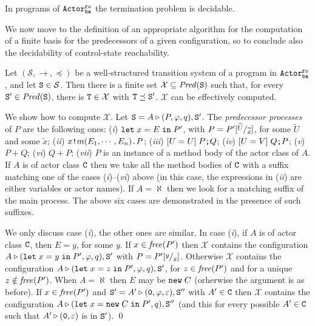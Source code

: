 \documentclass{LMCS}
\newcommand{\cal}{\mathcal}
\theoremstyle{plain}\newtheorem{proposition}[thm]{Proposition}
\theoremstyle{plain}\newtheorem{lemma}[thm]{Lemma}
\theoremstyle{plain}\newtheorem{theorem}[thm]{Theorem}
\theoremstyle{plain}\newtheorem{corollary}[thm]{Corollary}
\newif\ifconf \conffalse
\newif\ifcamera \camerafalse
\newcommand{\subst}[2]{[\raisebox{.5ex}{\footnotesize$#1$}  /
                        \raisebox{-.5ex}{\footnotesize$#2$} ]}
\newcommand{\pinull}{{\tt 0}}
\newcommand{\invk}{\mbox{\tt !}}
\newcommand{\prefix}{\mbox{\tt .}}
\newcommand{\newact}[1]{{\tt new} \; #1}
\newcommand{\letin}[3]{{\tt let} \; #1 = #2 \; {\tt in} \; #3}
\newcommand{\State}{{\tt S}}
\newcommand{\StateT}{{\tt T}}
\newcommand{\lred}[1]{\stackrel{#1}{\longrightarrow}}
\newcommand{\ite}{\mbox{{\tt ;}}}
\newcommand{\free}[1]{{\it free}(#1)}
\newcommand{\pred}[1]{{\it Pred}(#1)}
\newcommand{\wt}[1]{\widetilde{#1}}
\newcommand{\adef}[1]{{\tt #1}}
\newcommand{\actroba}{${\tt Actor^{\tt ro}_{\tt ba}}$}
\begin{document}
\begin{thm}
\ifcamera
In {\actroba} termination is decidable.
\else
In programs of {\actroba}
the termination
problem is decidable.
\fi
\end{thm}

We now move to the definition of an appropriate algorithm for the
computation of a finite basis for the predecessors of a given configuration,
so to conclude also the decidability of control-state reachability.

\begin{lem}
\label{lem.pred}
Let $({\cal S}, \lred{}, \preceq)$ be a well-structured transition system 
of a program in {\actroba}, and let $\State \in
{\cal S}$. Then there is a finite set ${\cal X} \subseteq \pred{\State}$ 
such that, for every $\State' \in \pred{\State}$, there is $\StateT \in {\cal X}$
with $\StateT \preceq \State'$. ${\cal X}$ can be effectively computed.
\end{lem}

\ifconf
\else

\proof
We show how to compute ${\cal X}$. Let $\State = 
A \triangleright (P,\varphi, q), \State'$. The \emph{predecessor processes} of $P$ are the following ones:
(\emph{i}) $\letin{x}{E}{P'}$, with $P = P' \subst{\wt{U}}{\wt{x}}$, for some 
$\wt{U}$ and some ${\wt{x}}$;
(\emph{ii}) $ x \invk m(E_1, \cdots , E_n) \prefix P$;
(\emph{iii}) $[U=U] \; P \ite Q$;
(\emph{iv}) $[U=V] \; Q \ite P$;
(\emph{v}) $P + Q$;
(\emph{vi}) $Q+P$;
(\emph{vii}) $P$ is an instance of a method body of the actor class of $A$.
If $A$ is of actor class $\adef{C}$ then we take all the method bodies of
$\adef{C}$ with a suffix matching one of the cases (\emph{i})--(\emph{vi}) 
above (in this case, the expressions in (\emph{ii}) are either variables or
actor names). If $A = \aleph$ then we look for a matching suffix of the 
main process. The above six cases are demonstrated 
in the presence of such suffixes.

We only discuss case (\emph{i}), the other ones are similar.
In case (\emph{i}), if $A$ is of actor class $\adef{C}$, then 
$E = y$, for some $y$. If $x \in \free{P'}$ then  ${\cal X}$ contains the configuration
$A \triangleright (\letin{x}{y}{P'}, \varphi, q), \State'$ with 
$P = P' \subst{y}{x}$. Otherwise ${\cal X}$ contains the configuration
$A \triangleright (\letin{x}{z}{P'},\varphi, q), \State'$, for $z
\in \free{P'}$ and for a unique $z \notin \free{P'}$.
When $A = \aleph$ then $E$ may be $\newact{C}$ (orherwise the 
argument is as before). 
If $x \in \free{P'}$ and $\State' = A' \triangleright (\pinull, \varphi, 
\varepsilon), \State''$ with $A' \in \adef{C}$
then  ${\cal X}$ contains the configuration
$A \triangleright (\letin{x}{\newact{C}}{P'},q), \State''$
(and this for every possible $A' \in \adef{C}$ such that
$A' \triangleright (\pinull, 
\varepsilon)$ is in $\State'$).
\qed
\fi
\end{document}
